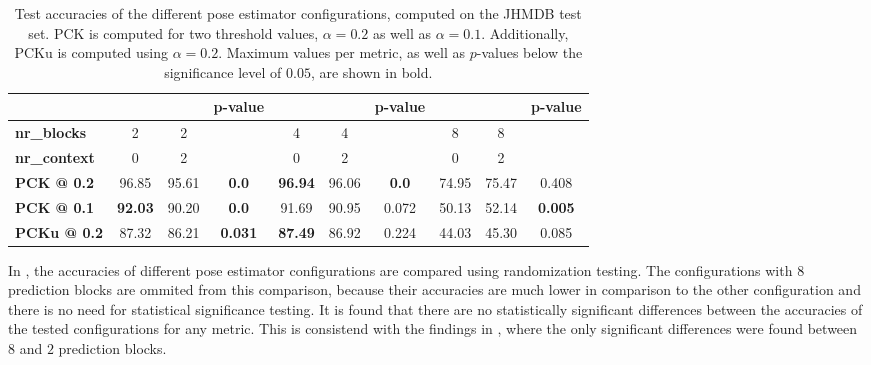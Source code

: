 \begin{table}[]
    \small
    \centering
    \begin{tabular}{|l|c|c|c||c|c|c||c|c|c|}
    \hline
        & & & \textbf{p-value} & & & \textbf{p-value} & & & \textbf{p-value} \\ \hline
        \textbf{nr\_blocks} & 2 & 2 &  & 4 & 4 &  & 8 & 8 &  \\ \hline
    \textbf{nr\_context} & 0 & 2 & & 0 & 2 & & 0 & 2 &\\ \hline
        \textbf{PCK @ 0.2} & 96.85 & 95.61 & \textbf{0.0} & \textbf{96.94} & 96.06 & \textbf{0.0} & 74.95 & 75.47 & 0.408 \\ \hline
        \textbf{PCK @ 0.1} & \textbf{92.03} & 90.20 & \textbf{0.0} & 91.69 & 90.95 & 0.072 & 50.13 & 52.14 & \textbf{0.005} \\ \hline
        \textbf{PCKu @ 0.2} & 87.32 & 86.21 & \textbf{0.031} & \textbf{87.49} & 86.92 &  0.224 & 44.03 & 45.30 & 0.085 \\ \hline
    \end{tabular}
    \caption{Test accuracies of the different pose estimator configurations, computed on the JHMDB test set. PCK is computed for two threshold values, $\alpha = 0.2$ as well as $\alpha = 0.1$. Additionally, PCKu is computed using $\alpha = 0.2$. Maximum values per metric, as well as $p$-values below the significance level of $0.05$, are shown in bold.}
    \label{tab:jhmdb_results}
\end{table}

In , the accuracies of different pose estimator configurations are compared using randomization testing.
The configurations with $8$ prediction blocks are ommited from this comparison, because their accuracies are much lower in comparison to the other configuration and there is no need for statistical significance testing.
It is found that there are no statistically significant differences between the accuracies of the tested configurations for any metric.
This is consistend with the findings in , where the only significant differences were found between $8$ and $2$ prediction blocks.

